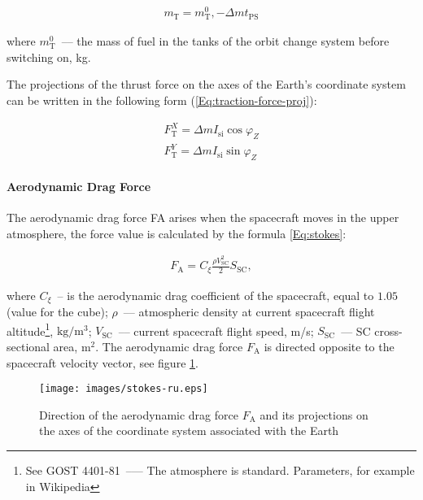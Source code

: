 \documentclass[12pt,a4paper]{article}
\begin{document}
\begin{eqnarray}
  m_{\text{Т}} = m_{\text{T}}^0, - \Delta m t_{\text{PS}}
\end{eqnarray}

where $m_{\text{T}}^0$~--– the mass of fuel in the tanks of the orbit change system before switching on,
kg.

The projections of the thrust force on the axes of the Earth's coordinate system can be written in the following form
(\ref{Eq:traction-force-proj}):

\begin{eqnarray}
  F_{\text{T}}^X = \Delta m I_{\text{si}} \cos{\varphi_Z} \nonumber \\
  F_{\text{T}}^Y = \Delta m I_{\text{si}} \sin{\varphi_Z} \label{Eq:traction-force-proj}
\end{eqnarray}

\paragraph{Aerodynamic Drag Force}

The aerodynamic drag force FA arises when the spacecraft moves in the upper atmosphere, the force value is calculated by the formula \ref{Eq:stokes}:

\begin{eqnarray}
   F_{\text{A}} = C_\xi \frac{\rho V_{\text{SC}}^2}{2} S_{\text{SC}}, \label{Eq:stokes}
\end{eqnarray}

where $C_\xi$~-- is the aerodynamic drag coefficient of the spacecraft, equal to $1.05$ (value for the cube); $\rho$~--– atmospheric density at current spacecraft flight altitude\footnote{See GOST 4401-81~--— The atmosphere is standard. Parameters, for example in Wikipedia}, $\text{kg}/\text{m}^3$; $V_{\text{SC}}$~--– current spacecraft flight speed, m/s; $S_{\text{SC}}$~--- SC cross-sectional area, $\text{m}^2$. The aerodynamic drag force $F_{\text{A}}$ is directed opposite to the spacecraft velocity vector, see figure \ref{Pic:Stokes}.

\begin{figure}[tbh]
  \begin{center}
    \texttt{[image: images/stokes-ru.eps]}
    \caption{Direction of the aerodynamic drag force $F_{\text{A}}$ and its projections on the axes of the coordinate system associated with the Earth}
    \label{Pic:Stokes}
  \end{center}
\end{figure}
\end{document}
